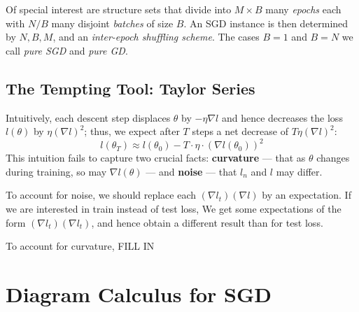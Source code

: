 \documentclass{article}
\begin{document}
    Of special interest are structure sets that divide into $M\times B$ many
    \emph{epochs} each with $N/B$ many disjoint \emph{batches} of size $B$.  An
    SGD instance is then determined by $N, B, M$, and an \emph{inter-epoch
    shuffling scheme}.  The cases $B=1$ and $B=N$ we call \emph{pure SGD} and
    \emph{pure GD}.

\subsection{The Tempting Tool: Taylor Series}
    Intuitively, each descent step displaces $\theta$ by $-\eta \nabla l$ and
    hence decreases the loss $l(\theta)$ by $\eta (\nabla l)^2$; thus, we
    expect after $T$ steps a net decrease of $T \eta (\nabla l)^2$:
    \begin{equation} \label{eq:motone}
        l(\theta_T) \approx l(\theta_0) - T \cdot \eta \cdot (\nabla l(\theta_0))^2
    \end{equation}
    This intuition fails to capture two crucial facts: {\bf curvature} --- that
    as $\theta$ changes during training, so may $\nabla l(\theta)$ --- and {\bf
    noise} --- that $l_n$ and $l$ may differ.

    To account for noise, we should replace each $(\nabla l_t)(\nabla l)$ by
    an expectation.  If we are interested in train instead of test loss, 
    We get some expectations of the form $(\nabla l_t)(\nabla l_t)$, and hence
    obtain a different result than for test loss.

    To account for curvature, {\color{red} FILL IN}
       

\section{Diagram Calculus for SGD}
\end{document}
